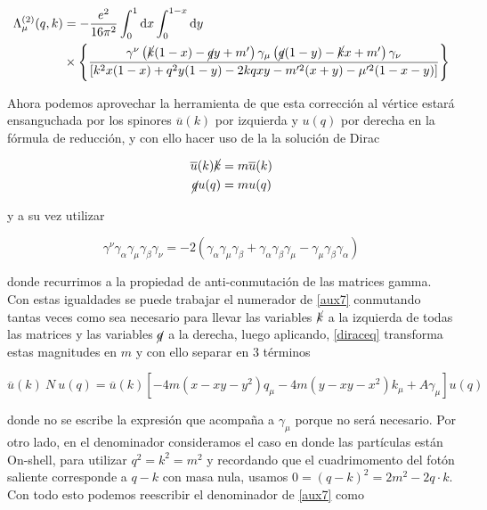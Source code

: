 \documentclass[tickz]{article}
\numberwithin{equation}{section}
\begin{document}
\begin{equation}\label{aux7}
\begin{aligned}
\Lambda^{(2)}_{\mu}(q,k)&=-\frac{e^2}{16 \pi^2}\int_0^1\mathrm{d}x\int_0^{1-x}\mathrm{d}y \\
& \times \left\{ \frac{  \gamma^{\nu}\left(\cancel{k}(1-x) -\cancel{q}y+m'\right)\gamma_{\mu}\left( \cancel{q}(1-y) -\cancel{k}x +m'\right)\gamma_{\nu}}{\left[k^2x(1-x) +q^2y(1-y) -2kqxy -m'^2(x+y) -\mu'^2(1-x-y)\right]} \right\}\\
\end{aligned}
\end{equation}

Ahora podemos aprovechar la herramienta de que esta corrección al vértice estará ensanguchada por los spinores $ \overline{u}(k) $ por izquierda y $ u(q) $ por derecha en la fórmula de reducción, y con ello hacer uso de la la solución de Dirac

\begin{equation}\label{diraceq}
\begin{aligned}
\overline{u}(k) \cancel{k}&=m\overline{u}(k)\\
\cancel{q} u(q)&= m u(q)
\end{aligned}
\end{equation}  

y a su vez utilizar

\begin{equation}\label{key}
\gamma^{\nu}\gamma_{\alpha}\gamma_{\mu}\gamma_{\beta}\gamma_{\nu} = -2 \left( \gamma_{\alpha}\gamma_{\mu}\gamma_{\beta} + \gamma_{\alpha}\gamma_{\beta}\gamma_{\mu} -\gamma_{\mu}\gamma_{\beta}\gamma_{\alpha}\right)
\end{equation}

donde recurrimos a la propiedad de anti-conmutación de las matrices gamma. Con estas igualdades se puede trabajar el numerador de \ref{aux7} conmutando tantas veces como sea necesario para llevar las variables $ \cancel{k} $ a la izquierda de todas las matrices y las variables $ \cancel{q} $ a la derecha, luego aplicando, \ref{diraceq} transforma estas magnitudes en $ m $ y con ello separar en 3 términos

\begin{equation}\label{num}
\overline{u}(k) \ N \ u(q) = \overline{u}(k) \left[-4m\left(x-xy-y^2\right)q_{\mu} -4m\left(y-xy-x^2\right)k_{\mu} + A\gamma_{\mu}\right] u(q)
\end{equation}

donde no se escribe la expresión que acompaña a $ \gamma_{\mu} $ porque no será necesario. Por otro lado, en el denominador consideramos el caso en donde las partículas están On-shell, para utilizar $ q^2 =k^2= m^2 $ y recordando que el cuadrimomento del fotón saliente corresponde a $q-k $ con masa nula, usamos $ 0 = \left(q-k\right)^2=2m^2 - 2q\cdot k $. Con todo esto podemos reescribir el denominador de \ref{aux7} como
\end{document}
